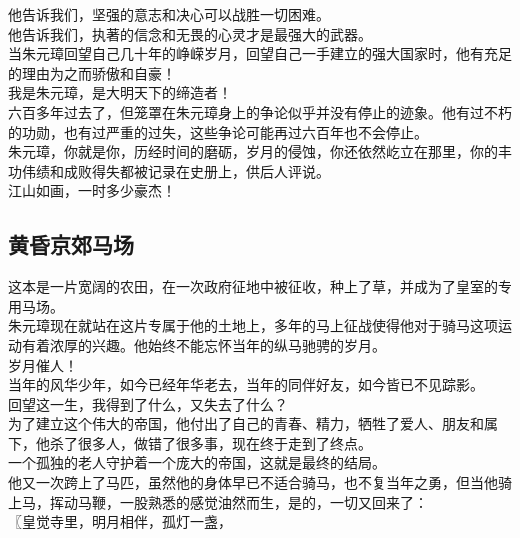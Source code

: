 \begin{multicols}{\theparacolNo}
他告诉我们，坚强的意志和决心可以战胜一切困难。\\

他告诉我们，执著的信念和无畏的心灵才是最强大的武器。\\

当朱元璋回望自己几十年的峥嵘岁月，回望自己一手建立的强大国家时，他有充足的理由为之而骄傲和自豪！\\

我是朱元璋，是大明天下的缔造者！\\

六百多年过去了，但笼罩在朱元璋身上的争论似乎并没有停止的迹象。他有过不朽的功勋，也有过严重的过失，这些争论可能再过六百年也不会停止。\\

朱元璋，你就是你，历经时间的磨砺，岁月的侵蚀，你还依然屹立在那里，你的丰功伟绩和成败得失都被记录在史册上，供后人评说。\\

江山如画，一时多少豪杰！\\

\subsection{黄昏京郊马场}
这本是一片宽阔的农田，在一次政府征地中被征收，种上了草，并成为了皇室的专用马场。\\

朱元璋现在就站在这片专属于他的土地上，多年的马上征战使得他对于骑马这项运动有着浓厚的兴趣。他始终不能忘怀当年的纵马驰骋的岁月。\\

岁月催人！\\

当年的风华少年，如今已经年华老去，当年的同伴好友，如今皆已不见踪影。\\

回望这一生，我得到了什么，又失去了什么？\\

为了建立这个伟大的帝国，他付出了自己的青春、精力，牺牲了爱人、朋友和属下，他杀了很多人，做错了很多事，现在终于走到了终点。\\

一个孤独的老人守护着一个庞大的帝国，这就是最终的结局。\\

他又一次跨上了马匹，虽然他的身体早已不适合骑马，也不复当年之勇，但当他骑上马，挥动马鞭，一股熟悉的感觉油然而生，是的，一切又回来了：\\

〖皇觉寺里，明月相伴，孤灯一盏，\\


\end{multicols}
